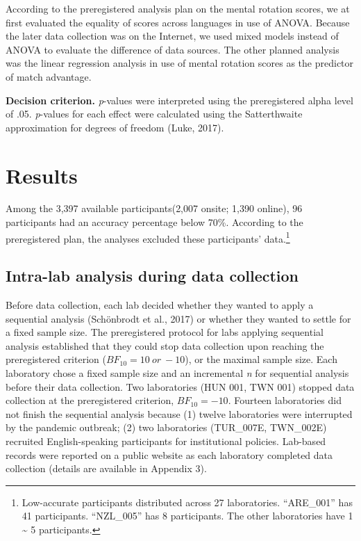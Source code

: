 \documentclass[
  man]{apa7}
\begin{document}
According to the preregistered analysis plan on the mental rotation scores, we at first evaluated the equality of scores across languages in use of ANOVA. Because the later data collection was on the Internet, we used mixed models instead of ANOVA to evaluate the difference of data sources. The other planned analysis was the linear regression analysis in use of mental rotation scores as the predictor of match advantage.

\textbf{Decision criterion.} \emph{p}-values were interpreted using the preregistered alpha level of .05. \emph{p}-values for each effect were calculated using the Satterthwaite approximation for degrees of freedom (Luke, 2017).

\hypertarget{results}{%
\section{Results}\label{results}}

Among the 3,397 available participants(2,007 onsite; 1,390 online), 96 participants had an accuracy percentage below 70\%. According to the preregistered plan, the analyses excluded these participants' data.\footnote{Low-accurate participants distributed across 27 laboratories. ``ARE\_001'' has 41 participants. ``NZL\_005'' has 8 participants. The other laboratories have 1 \textasciitilde{} 5 participants.}

\hypertarget{intra-lab-analysis-during-data-collection}{%
\subsection{Intra-lab analysis during data collection}\label{intra-lab-analysis-during-data-collection}}

Before data collection, each lab decided whether they wanted to apply a sequential analysis (Schönbrodt et al., 2017) or whether they wanted to settle for a fixed sample size. The preregistered protocol for labs applying sequential analysis established that they could stop data collection upon reaching the preregistered criterion (\(BF_{10} = 10\ or\ -10\)), or the maximal sample size. Each laboratory chose a fixed sample size and an incremental \emph{n} for sequential analysis before their data collection. Two laboratories (HUN 001, TWN 001) stopped data collection at the preregistered criterion, \(BF_{10} = -10\). Fourteen laboratories did not finish the sequential analysis because (1) twelve laboratories were interrupted by the pandemic outbreak; (2) two laboratories (TUR\_007E, TWN\_002E) recruited English-speaking participants for institutional policies. Lab-based records were reported on a public website as each laboratory completed data collection (details are available in Appendix 3).
\end{document}
